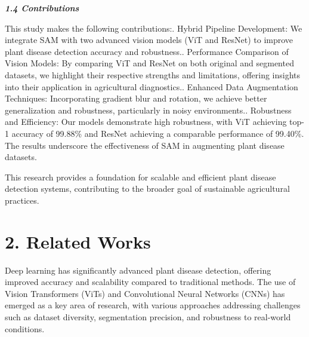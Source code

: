 \documentclass{article}
\begin{document}
\textbf{\textit{1.4 Contributions}}

This study makes the following contributions:. Hybrid Pipeline Development: We integrate SAM with two advanced vision models (ViT and ResNet) to improve plant disease detection accuracy and robustness.. Performance Comparison of Vision Models: By comparing ViT and ResNet on both original and segmented datasets, we highlight their respective strengths and limitations, offering insights into their application in agricultural diagnostics.. Enhanced Data Augmentation Techniques: Incorporating gradient blur and rotation, we achieve better generalization and robustness, particularly in noisy environments.. Robustness and Efficiency: Our models demonstrate high robustness, with ViT achieving top-1 accuracy of 99.88\% and ResNet achieving a comparable performance of 99.40\%. The results underscore the effectiveness of SAM in augmenting plant disease datasets.\newline

This research provides a foundation for scalable and efficient plant disease detection systems, contributing to the broader goal of sustainable agricultural practices.



\section*{2. Related Works}
Deep learning has significantly advanced plant disease detection, offering improved accuracy and scalability compared to traditional methods. The use of Vision Transformers (ViTs) and Convolutional Neural Networks (CNNs) has emerged as a key area of research, with various approaches addressing challenges such as dataset diversity, segmentation precision, and robustness to real-world conditions.
\end{document}
